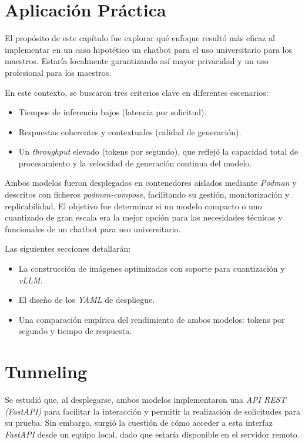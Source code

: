\section{Aplicación Práctica}
El propósito de este capítulo fue explorar qué enfoque resultó más eficaz al implementar en un caso hipotético un chatbot para el uso universitario para los maestros. Estaría localmente garantizando así mayor privacidad y un uso profesional para los maestros.

\noindent En este contexto, se buscaron tres criterios clave en diferentes escenarios:
\begin{itemize}
    \item Tiempos de inferencia bajos (latencia por solicitud).
    \item Respuestas coherentes y contextuales (calidad de generación).
    \item Un \textit{throughput} elevado (tokens por segundo), que reflejó la capacidad total de procesamiento y la velocidad de generación continua del modelo.
\end{itemize}
Ambos modelos fueron desplegados en contenedores aislados mediante \textit{Podman} y descritos con ficheros \textit{podman-compose}, facilitando su gestión, monitorización y replicabilidad. El objetivo fue determinar si un modelo compacto o uno cuantizado de gran escala era la mejor opción para las necesidades técnicas y funcionales de un chatbot para uso universitario.

\noindent Las siguientes secciones detallarán:
\begin{itemize}
    \item La construcción de imágenes optimizadas con soporte para cuantización y \textit{vLLM}.
    \item El diseño de los \textit{YAML} de despliegue.
    \item Una comparación empírica del rendimiento de ambos modelos: tokens por segundo y tiempo de respuesta.
\end{itemize}

\section{Tunneling}
Se estudió que, al desplegarse, ambos modelos implementaron una \textit{API REST (FastAPI)} para facilitar la interacción y permitir la realización de solicitudes para su prueba. Sin embargo, surgió la cuestión de cómo acceder a esta interfaz \textit{FastAPI} desde un equipo local, dado que estaría disponible en el servidor remoto.

